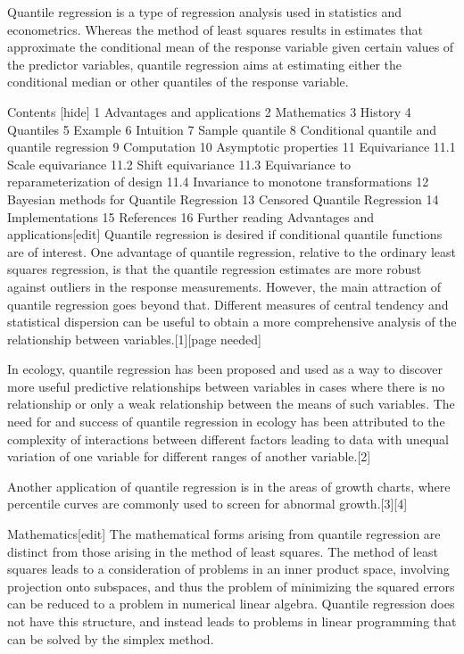 
Quantile regression is a type of regression analysis used in statistics and econometrics. Whereas the method of least squares results in estimates that approximate the conditional mean of the response variable given certain values of the predictor variables, quantile regression aims at estimating either the conditional median or other quantiles of the response variable.

Contents  [hide] 
1	Advantages and applications
2	Mathematics
3	History
4	Quantiles
5	Example
6	Intuition
7	Sample quantile
8	Conditional quantile and quantile regression
9	Computation
10	Asymptotic properties
11	Equivariance
11.1	Scale equivariance
11.2	Shift equivariance
11.3	Equivariance to reparameterization of design
11.4	Invariance to monotone transformations
12	Bayesian methods for Quantile Regression
13	Censored Quantile Regression
14	Implementations
15	References
16	Further reading
Advantages and applications[edit]
Quantile regression is desired if conditional quantile functions are of interest. One advantage of quantile regression, relative to the ordinary least squares regression, is that the quantile regression estimates are more robust against outliers in the response measurements. However, the main attraction of quantile regression goes beyond that. Different measures of central tendency and statistical dispersion can be useful to obtain a more comprehensive analysis of the relationship between variables.[1][page needed]

In ecology, quantile regression has been proposed and used as a way to discover more useful predictive relationships between variables in cases where there is no relationship or only a weak relationship between the means of such variables. The need for and success of quantile regression in ecology has been attributed to the complexity of interactions between different factors leading to data with unequal variation of one variable for different ranges of another variable.[2]

Another application of quantile regression is in the areas of growth charts, where percentile curves are commonly used to screen for abnormal growth.[3][4]

Mathematics[edit]
The mathematical forms arising from quantile regression are distinct from those arising in the method of least squares. The method of least squares leads to a consideration of problems in an inner product space, involving projection onto subspaces, and thus the problem of minimizing the squared errors can be reduced to a problem in numerical linear algebra. Quantile regression does not have this structure, and instead leads to problems in linear programming that can be solved by the simplex method.

